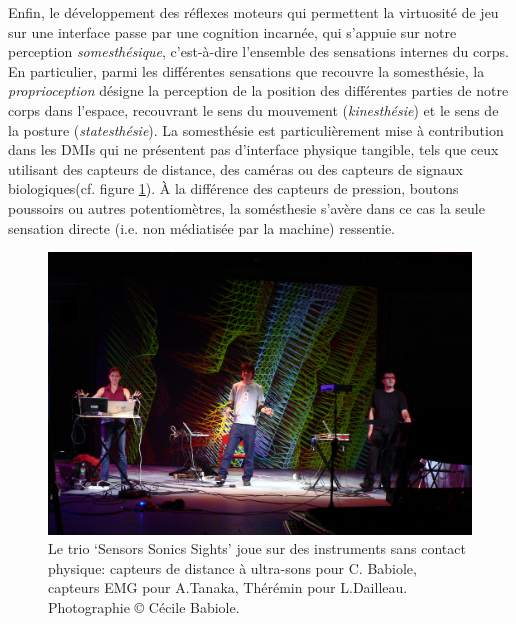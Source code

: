 \noindent Enfin, le développement des réflexes moteurs qui permettent la virtuosité de jeu sur une interface passe par une cognition incarnée, qui s'appuie sur notre perception \textit{somesthésique}, c'est-à-dire l'ensemble des sensations internes du corps. En particulier, parmi les différentes sensations que recouvre la somesthésie, la \textit{proprioception} désigne la perception de la position des différentes parties de notre corps dans l'espace, recouvrant le sens du mouvement (\textit{kinesthésie}) et le sens de la posture (\textit{statesthésie}). La somesthésie est particulièrement mise à contribution dans les \glspl{DMI} qui ne présentent pas d'interface physique tangible, tels que ceux utilisant des capteurs de distance, des caméras ou des capteurs de signaux biologiques(cf. figure \ref{fig:interface:SensorsSonicsSights}). À la différence des capteurs de pression, boutons poussoirs ou autres potentiomètres, la somésthesie s'avère dans ce cas la seule sensation directe (i.e. non médiatisée par la machine) ressentie.

\begin{figure}[!htbp]
	\captionsetup{format=plain}%
	\includegraphics[width=\textwidth]{gfx/05_interfaces/SensorsSonicsSights.jpg}
	\caption[Frettage virtuel par retour vibro-tactile]{Le trio `Sensors Sonics Sights' joue sur des instruments sans contact physique: capteurs de distance à ultra-sons pour C. Babiole, capteurs \gls{EMG} pour A.Tanaka, Thérémin pour L.Dailleau. Photographie © Cécile Babiole.}
	\label{fig:interface:SensorsSonicsSights}
\end{figure}

